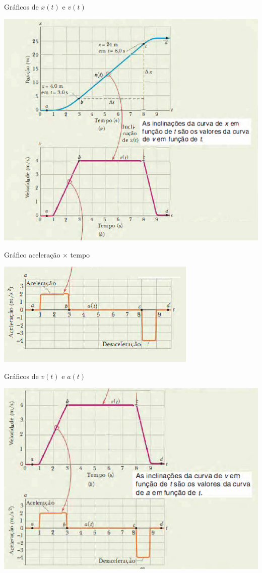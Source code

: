 \documentclass[xcolor=dvipsnames,table]{beamer}
\begin{document}
	\begin{frame}{Gráficos de $x(t)$ e $v(t)$}
		\begin{center}
			\includegraphics[scale=0.6]{images/fig2-6ab}
		\end{center}
	\end{frame}

	\begin{frame}{Gráfico aceleração $\times$ tempo}
		\begin{center}
			\includegraphics[scale=0.7]{images/fig2-6c}
		\end{center}
	\end{frame}

	\begin{frame}{Gráficos de $v(t)$ e $a(t)$}
		\begin{center}
			\includegraphics[scale=0.6]{images/fig2-6bc}
		\end{center}
	\end{frame}
		
	\begin{frame}
		\titlepage
	\end{frame}
	
\end{document}
